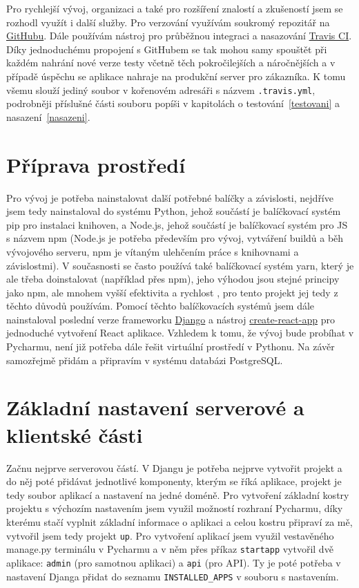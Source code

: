     Pro rychlejší vývoj, organizaci a také pro rozšíření znalostí a zkušeností jsem se rozhodl využít i další služby. Pro verzování využívám soukromý repozitář na \href{https://github.com/}{GitHubu}. Dále používám nástroj pro průběžnou integraci a nasazování \href{https://travis-ci.com/}{Travis CI}. Díky jednoduchému propojení s GitHubem se tak mohou samy spouštět při každém nahrání nové verze testy včetně těch pokročilejších a náročnějších a v případě úspěchu se aplikace nahraje na produkční server pro zákazníka. K tomu všemu slouží jediný soubor v kořenovém adresáři s názvem \verb|.travis.yml|, podrobněji příslušné části souboru popíši v kapitolách o testování~\ref{testovani} a nasazení~\ref{nasazeni}.
    
    \section{Příprava prostředí}
    Pro vývoj je potřeba nainstalovat další potřebné balíčky a závislosti, nejdříve jsem tedy nainstaloval do systému Python, jehož součástí je balíčkovací systém pip pro instalaci knihoven, a Node.js, jehož součástí je balíčkovací systém pro JS s názvem npm (Node.js je potřeba především pro vývoj, vytváření buildů a běh vývojového serveru, npm je vítaným ulehčením práce s knihovnami a závislostmi). V současnosti se často používá také balíčkovací systém yarn, který je ale třeba doinstalovat (například přes npm), jeho výhodou jsou stejné principy jako npm, ale mnohem vyšší efektivita a rychlost \cite{yarn}, pro tento projekt jej tedy z těchto důvodů používám. Pomocí těchto balíčkovacích systémů jsem dále nainstaloval poslední verze frameworku \href{https://www.djangoproject.com/}{Django} a nástroj \href{https://github.com/facebook/create-react-app}{create-react-app} pro jednoduché vytvoření React aplikace. Vzhledem k tomu, že vývoj bude probíhat v Pycharmu, není již potřeba dále řešit virtuální prostředí v Pythonu. Na závěr samozřejmě přidám a připravím v systému databázi PostgreSQL.
    
    \section{Základní nastavení serverové a klientské části}\label{zakladninastaveni}
    Začnu nejprve serverovou částí. V Djangu je potřeba nejprve vytvořit projekt a do něj poté přidávat jednotlivé komponenty, kterým se říká aplikace, projekt je tedy soubor aplikací a nastavení na jedné doméně. Pro vytvoření základní kostry projektu s výchozím nastavením jsem využil možností rozhraní Pycharmu, díky kterému stačí vyplnit základní informace o aplikaci a celou kostru připraví za mě, vytvořil jsem tedy projekt \verb|up|. Pro vytvoření aplikací jsem využil vestavěného manage.py terminálu v Pycharmu a v něm přes příkaz \verb|startapp| vytvořil dvě aplikace: \verb|admin| (pro samotnou aplikaci) a \verb|api| (pro API). Ty je poté potřeba v nastavení Djanga přidat do seznamu \verb|INSTALLED_APPS| v souboru s nastavením.
    
